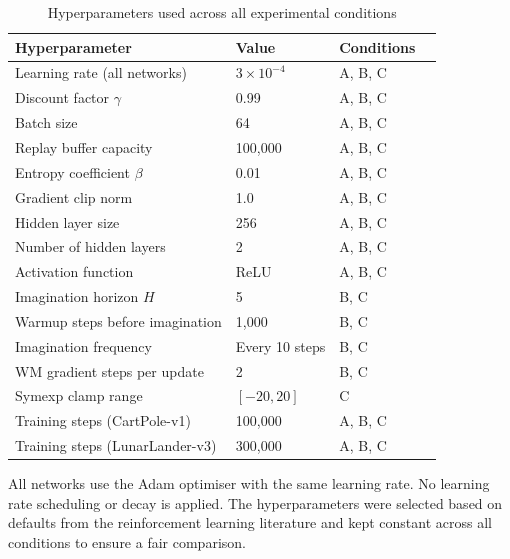\begin{table}[!ht]
    \centering
    \caption{Hyperparameters used across all experimental conditions}
    \label{tab:hyperparams}
    \begin{tabular}{llll}
        \toprule
        \textbf{Hyperparameter} & \textbf{Value} & \textbf{Conditions} \\
        \midrule
        Learning rate (all networks)        & $3 \times 10^{-4}$   & A, B, C \\
        Discount factor $\gamma$            & 0.99                 & A, B, C \\
        Batch size                          & 64                   & A, B, C \\
        Replay buffer capacity              & 100{,}000            & A, B, C \\
        Entropy coefficient $\beta$         & 0.01                 & A, B, C \\
        Gradient clip norm                  & 1.0                  & A, B, C \\
        Hidden layer size                   & 256                  & A, B, C \\
        Number of hidden layers             & 2                    & A, B, C \\
        Activation function                 & ReLU                 & A, B, C \\
        Imagination horizon $H$             & 5                    & B, C \\
        Warmup steps before imagination     & 1{,}000              & B, C \\
        Imagination frequency               & Every 10 steps       & B, C \\
        WM gradient steps per update        & 2                    & B, C \\
        Symexp clamp range                  & $[-20, 20]$          & C \\
        \midrule
        Training steps (CartPole-v1)        & 100{,}000            & A, B, C \\
        Training steps (LunarLander-v3)     & 300{,}000            & A, B, C \\
        \bottomrule
    \end{tabular}
\end{table}

All networks use the Adam optimiser with the same learning rate. No learning rate
scheduling or decay is applied. The hyperparameters were selected based on
defaults from the reinforcement learning
literature and kept constant across all conditions to ensure a
fair comparison.


